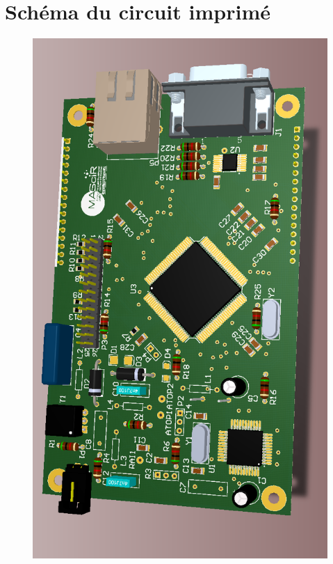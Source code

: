 \documentclass[11pt, a4paper, twoside]{book}
\begin{document}
\chapter{Schéma du circuit imprimé}
%
\begin{figure}[h]
\centering
\includegraphics[width=\textwidth]{pcb}
\end{figure}
\end{document}
